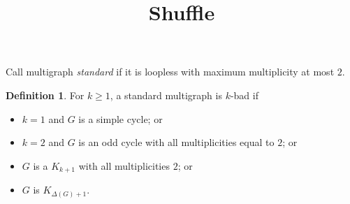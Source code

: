 \documentclass[12pt]{amsart}
\title{Shuffle}
\author{}
\theoremstyle{plain}
\theoremstyle{definition}
\newtheorem{defn}{Definition}
\theoremstyle{remark}
\begin{document}
\maketitle

Call multigraph \emph{standard} if it is loopless with maximum multiplicity at most $2$.

\begin{defn}
For $k \ge 1$, a standard multigraph is $k$-bad if
\begin{itemize}
\item $k = 1$ and $G$ is a simple cycle; or
\item $k = 2$ and $G$ is an odd cycle with all multiplicities equal to $2$; or
\item $G$ is a $K_{k+1}$ with all multiplicities $2$; or
\item $G$ is $K_{\Delta(G) + 1}$.
\end{itemize}
\end{defn}
\end{document}
